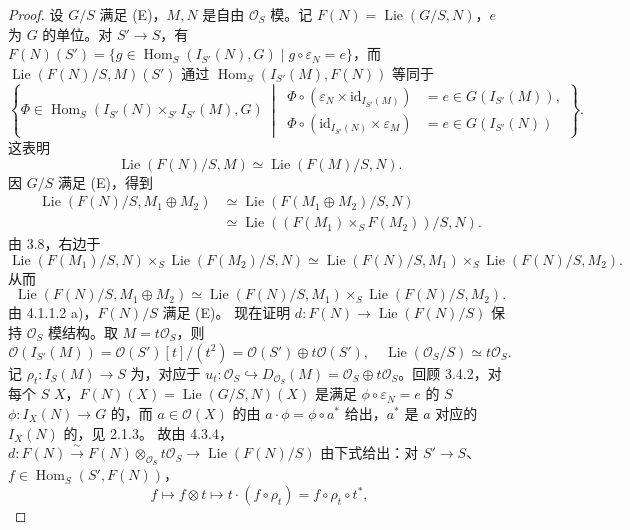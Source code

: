 \begin{proof}
设 $G/S$ 满足 (E)，$M,N$ 是自由 $\mathcal O_S$ 模。记 $F(N)=\operatorname{Lie}(G/S,N)$，$e$ 为 $G$ 的单位。对 $S'\to S$，有 $F(N)(S')=\{g\in\operatorname{Hom}_S(I_{S'}(N),G)\mid g\circ\varepsilon_N=e\}$，而 $\operatorname{Lie}(F(N)/S,M)(S')$ 通过 $\operatorname{Hom}_S(I_{S'}(M),F(N))$ 等同于
\[\left\{\Phi\in\operatorname{Hom}_S(I_{S'}(N)\times_{S'}I_{S'}(M),G)\ \middle|\ \begin{aligned}\Phi\circ(\varepsilon_N\times\mathrm{id}_{I_{S'}(M)})&=e\in G(I_{S'}(M)),\\\Phi\circ(\mathrm{id}_{I_{S'}(N)}\times\varepsilon_M)&=e\in G(I_{S'}(N))\end{aligned}\right\}.\]
这表明
\[\operatorname{Lie}(F(N)/S,M)\simeq\operatorname{Lie}(F(M)/S,N).\tag{1}\]
因 $G/S$ 满足 (E)，得到
\[\begin{aligned}
\operatorname{Lie}(F(N)/S,M_1\oplus M_2)&\simeq\operatorname{Lie}(F(M_1\oplus M_2)/S,N)\\&\simeq\operatorname{Lie}((F(M_1)\times_SF(M_2))/S,N).
\end{aligned}\]
由 3.8，右边于
\[\operatorname{Lie}(F(M_1)/S,N)\times_S\operatorname{Lie}(F(M_2)/S,N)\simeq\operatorname{Lie}(F(N)/S,M_1)\times_S\operatorname{Lie}(F(N)/S,M_2).\]
从而
\[\operatorname{Lie}(F(N)/S,M_1\oplus M_2)\simeq\operatorname{Lie}(F(N)/S,M_1)\times_S\operatorname{Lie}(F(N)/S,M_2).\tag{2}\]
由 4.1.1.2 a)，$F(N)/S$ 满足 (E)。
现在证明 $d:F(N)\to\operatorname{Lie}(F(N)/S)$ 保持 $\mathcal O_S$ 模结构。取 $M=t\mathcal O_S$，则
\[\mathcal O(I_{S'}(M))=\mathcal O(S')[t]/(t^2)=\mathcal O(S')\oplus t\mathcal O(S'),\quad\operatorname{Lie}(\mathcal O_S/S)\simeq t\mathcal O_S.\]
记 $\rho_t:I_S(M)\to S$ 为，对应于 $u_t:\mathcal O_S\hookrightarrow D_{\mathcal O_S}(M)=\mathcal O_S\oplus t\mathcal O_S$。回顾 3.4.2，对每个 $S$  $X$，$F(N)(X)=\operatorname{Lie}(G/S,N)(X)$ 是满足 $\phi\circ\varepsilon_N=e$ 的 $S$  $\phi:I_X(N)\to G$ 的，而 $a\in\mathcal O(X)$ 的由 $a\cdot\phi=\phi\circ a^*$ 给出，$a^*$ 是 $a$ 对应的 $I_X(N)$ 的，见 2.1.3。
故由 4.3.4， $d:F(N)\xrightarrow{\sim}F(N)\otimes_{\mathcal O_S}t\mathcal O_S\to\operatorname{Lie}(F(N)/S)$ 由下式给出：对 $S'\to S$、$f\in\operatorname{Hom}_S(S',F(N))$，
\[f\mapsto f\otimes t\mapsto t\cdot(f\circ\rho_t)=f\circ\rho_t\circ t^*,\]

\end{proof}
